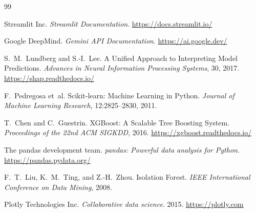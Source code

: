\documentclass[12pt,a4paper]{report}
\begin{document}
\clearpage
\begin{thebibliography}{99}

Streamlit Inc. \textit{Streamlit Documentation}. \url{https://docs.streamlit.io/}

Google DeepMind. \textit{Gemini API Documentation}. \url{https://ai.google.dev/}

S.~M.\ Lundberg and S.-I.\ Lee. A Unified Approach to Interpreting Model Predictions.
\textit{Advances in Neural Information Processing Systems}, 30, 2017.
\url{https://shap.readthedocs.io/}

F.~Pedregosa et~al. Scikit-learn: Machine Learning in Python.
\textit{Journal of Machine Learning Research}, 12:2825--2830, 2011.

T.~Chen and C.~Guestrin. XGBoost: A Scalable Tree Boosting System.
\textit{Proceedings of the 22nd ACM SIGKDD}, 2016.
\url{https://xgboost.readthedocs.io/}

The pandas development team. \textit{pandas: Powerful data analysis for Python}.
\url{https://pandas.pydata.org/}

F.~T.\ Liu, K.~M.\ Ting, and Z.-H.\ Zhou. Isolation Forest.
\textit{IEEE International Conference on Data Mining}, 2008.

Plotly Technologies Inc. \textit{Collaborative data science}. 2015.
\url{https://plotly.com}

\end{thebibliography}
\end{document}
